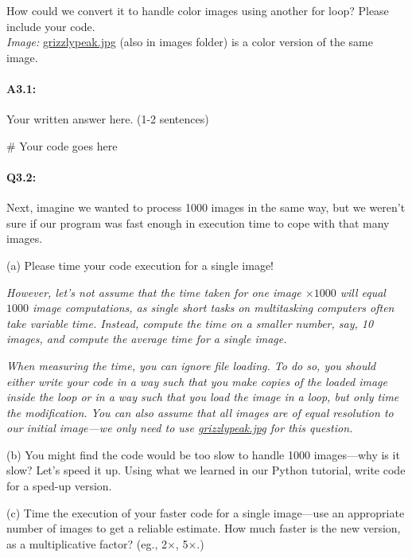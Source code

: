 \documentclass[11pt]{article}
\begin{document}
How could we convert it to handle color images using another for loop? Please include your code. \\

\emph{Image:} \href{images/grizzlypeak.jpg}{grizzlypeak.jpg} (also in images folder) is a color version of the same image.

\paragraph{A3.1:} Your written answer here. (1-2 sentences)
\begin{python}
# Your code goes here
\end{python}



\pagebreak
\paragraph{Q3.2:} Next, imagine we wanted to process 1000 images in the same way, but we weren't sure if our program was fast enough in execution time to cope with that many images. 

(a) Please time your code execution for a single image!

\emph{However, let's not assume that the time taken for one image $\times1000$ will equal $1000$ image computations, as single short tasks on multitasking computers often take variable time. Instead, compute the time on a smaller number, say, 10 images, and compute the average time for a single image.}

\emph{When measuring the time, you can ignore file loading. To do so, you should either write your code in a way such that you make copies of the loaded image inside the loop or in a way such that you load the image in a loop, but only time the modification. You can also assume that all images are of equal resolution to our initial image---we only need to use \href{grizzlypeak.jpg}{grizzlypeak.jpg} for this question.}

(b) You might find the code would be too slow to handle 1000 images---why is it slow? Let's speed it up. Using what we learned in our Python tutorial, write code for a sped-up version.

(c) Time the execution of your faster code for a single image---use an appropriate number of images to get a reliable estimate. How much faster is the new version, as a multiplicative factor? (eg., 2$\times$, 5$\times$.)
\end{document}
